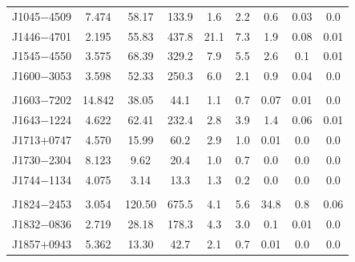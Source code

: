 \documentclass[useAMS,usenatbib]{mn2e}
\begin{document}
\begin{table}
\begin{center}
\begin{tabular}{lcccccccc}
J1045$-$4509&  7.474  &  58.17            & 133.9    & 1.6       & 2.2         &  0.6     &  0.03             &  0.0      \\ 
J1446$-$4701&  2.195  &  55.83            & 437.8    & 21.1      & 7.3         &  1.9     &  0.08             &  0.01     \\ 
J1545$-$4550&  3.575  &  68.39            & 329.2    & 7.9       & 5.5         &  2.6     &  0.1              &  0.01      \\ 
J1600$-$3053&  3.598  &  52.33            & 250.3    & 6.0       & 2.1         &  0.9     &  0.04             &  0.0      \\ 
            &         &                   &          &           &             &          &                   &           \\
J1603$-$7202&  14.842 &  38.05            & 44.1     & 1.1       & 0.7         &  0.07    &  0.01             &  0.0      \\ 
J1643$-$1224&  4.622  &  62.41            & 232.4    & 2.8       & 3.9         &  1.4     &  0.06             &  0.01      \\ 
J1713$+$0747&  4.570  &  15.99            & 60.2     & 2.9       & 1.0         &  0.01    &  0.0              &  0.0      \\ 
J1730$-$2304&  8.123  &  9.62             & 20.4     & 1.0       & 0.7         &  0.0     &  0.0              &  0.0      \\ 
%
%
J1744$-$1134&  4.075  &  3.14             & 13.3     & 1.3       & 0.2         &  0.0     &  0.0              &  0.0      \\ 
            &         &                   &          &           &             &          &                   &           \\
J1824$-$2453&  3.054  &  120.50           & 675.5    & 4.1       & 5.6         &  34.8    &  0.8              &  0.06     \\ 
J1832$-$0836&  2.719  &  28.18            & 178.3    & 4.3       & 3.0         &  0.1     &  0.01             &  0.0      \\ 
J1857$+$0943&  5.362  &  13.30            & 42.7     & 2.1       & 0.7         &  0.01    &  0.0              &  0.0      \\ 

\end{tabular}
\end{center}
\end{table}
\end{document}
